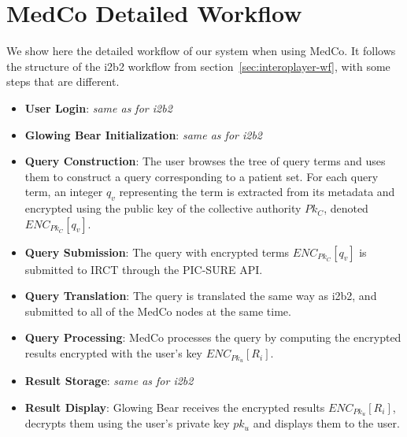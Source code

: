 

\section{MedCo Detailed Workflow}

We show here the detailed workflow of our system when using MedCo.
It follows the structure of the i2b2 workflow from section~\ref{sec:interoplayer-wf}, with some steps that are different.


\begin{itemize}
\item \textbf{User Login}: \emph{same as for i2b2}

\item \textbf{Glowing Bear Initialization}: \emph{same as for i2b2}

\item \textbf{Query Construction}:
The user browses the tree of query terms and uses them to construct a query corresponding to a patient set.
For each query term, an integer $q_v$ representing the term is extracted from its metadata and encrypted using the public key of the collective authority $Pk_C$, denoted $ENC_{Pk_C}[q_v]$.

\item \textbf{Query Submission}:
The query with encrypted terms $ENC_{Pk_C}[q_v]$ is submitted to IRCT through the PIC-SURE API.

\item \textbf{Query Translation}:
The query is translated the same way as i2b2, and submitted to all of the MedCo nodes at the same time.

\item \textbf{Query Processing}:
MedCo processes the query by computing the encrypted results encrypted with the user's key $ENC_{Pk_u}[R_i]$.

\item \textbf{Result Storage}: \emph{same as for i2b2}

\item \textbf{Result Display}:
Glowing Bear receives the encrypted results $ENC_{Pk_u}[R_i]$, decrypts them using the user's private key $pk_u$ and displays them to the user.
\end{itemize}


